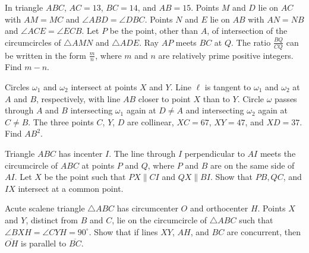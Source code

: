 \documentclass{article}
\begin{document}
\begin{prob}[AIME II 2010/15]{6}
In triangle $ABC$, $AC = 13$, $BC = 14$, and $AB=15$. Points $M$ and $D$ lie on $AC$ with $AM=MC$ and $\angle ABD = \angle DBC$. Points $N$ and $E$ lie on $AB$ with $AN=NB$ and $\angle ACE = \angle ECB$. Let $P$ be the point, other than $A$, of intersection of the circumcircles of $\triangle AMN$ and $\triangle ADE$. Ray $AP$ meets $BC$ at $Q$. The ratio $\frac{BQ}{CQ}$ can be written in the form $\frac{m}{n}$, where $m$ and $n$ are relatively prime positive integers. Find $m-n.$
\end{prob}

\begin{prob}[AIME I 2016/15]{6}
Circles $\omega_1$ and $\omega_2$ intersect at points $X$ and $Y$. Line $\ell$ is tangent to $\omega_1$ and $\omega_2$ at $A$ and $B$, respectively, with line $AB$ closer to point $X$ than to $Y$. Circle $\omega$ passes through $A$ and $B$ intersecting $\omega_1$ again at $D \neq A$ and intersecting $\omega_2$ again at $C \neq B$. The three points $C$, $Y$, $D$ are collinear, $XC = 67$, $XY = 47$, and $XD = 37$. Find $AB^2$.
\end{prob}

\begin{prob}[PUMaC 2017]{9}
Triangle $ABC$ has incenter $I$. The line through $I$ perpendicular to $AI$ meets the circumcircle of $ABC$ at points $P$ and $Q$, where $P$ and $B$ are on the same side of $AI$. Let $X$ be the point such that $PX \parallel CI$ and $QX \parallel BI$. Show that $PB, QC$, and $IX$ intersect at a common point.
\end{prob}

\begin{prob}[USAMTS 2018]{13}
Acute scalene triangle $\triangle ABC$ has circumcenter $O$ and orthocenter $H$. Points $X$ and $Y$, distinct from $B$ and $C$, lie on the circumcircle of $\triangle ABC$ such that $\angle BXH = \angle CYH = 90^\circ$. Show that if lines $XY$, $AH$, and $BC$ are concurrent, then $\overline{OH}$ is parallel to $\overline{BC}$.
\end{prob}
\end{document}
